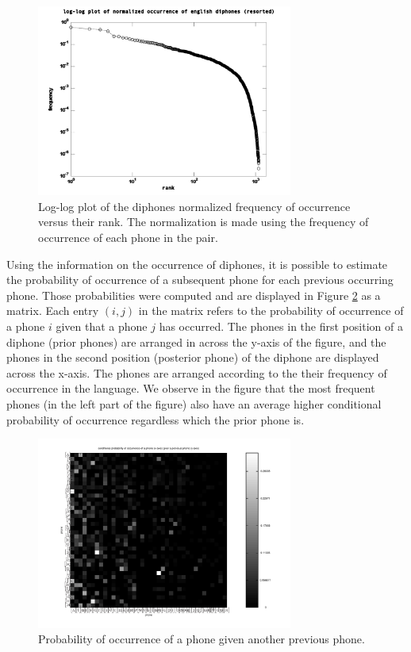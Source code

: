 \begin{figure}[h!]
\centering
\includegraphics[width=0.75\textwidth]{images/diphonesnormalizedfrequencyresorted_en.pdf}
\caption{Log-log plot of the diphones normalized frequency of occurrence versus their rank. The normalization is made using the frequency of occurrence of each phone in the pair.}
\label{fig:diphonesnormalizedfrequencyresorted_en}
\end{figure} 


Using the information on the occurrence of diphones, it is possible to estimate the probability of occurrence of a subsequent phone for each previous occurring phone. Those probabilities were computed and are displayed in Figure \ref{fig:diphones_cond_probability_en} as a matrix. Each entry $(i,j)$ in the matrix refers to the probability of occurrence of a phone $i$ given that a phone $j$ has occurred. The phones in the first position of a diphone (prior phones) are arranged in across the y-axis of the figure, and the phones in the second position (posterior phone) of the diphone are displayed across the x-axis. The phones are arranged according to the their frequency of occurrence in the language. We observe in the figure that the most frequent phones (in the left part of the figure) also have an average higher conditional probability of occurrence regardless which the prior phone is.


\begin{figure}[h!]
\centering
\includegraphics[width=0.75\textwidth]{images/diphones_cond_probability_en.pdf}
\caption{Probability of occurrence of a phone given another previous phone.}
\label{fig:diphones_cond_probability_en}
\end{figure} 



